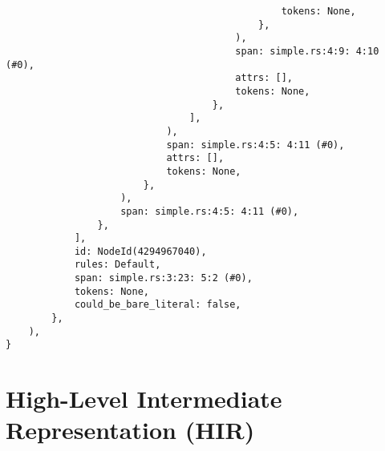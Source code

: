 \documentclass[
  11pt,
  twoside,symmetric]{report}
\begin{document}
\begin{verbatim}
                                                tokens: None,
                                            },
                                        ),
                                        span: simple.rs:4:9: 4:10 (#0),
                                        attrs: [],
                                        tokens: None,
                                    },
                                ],
                            ),
                            span: simple.rs:4:5: 4:11 (#0),
                            attrs: [],
                            tokens: None,
                        },
                    ),
                    span: simple.rs:4:5: 4:11 (#0),
                },
            ],
            id: NodeId(4294967040),
            rules: Default,
            span: simple.rs:3:23: 5:2 (#0),
            tokens: None,
            could_be_bare_literal: false,
        },
    ),
}
\end{verbatim}

\normalsize

\section{High-Level Intermediate Representation
(HIR)}\label{high-level-intermediate-representation-hir}

\small
\end{document}
